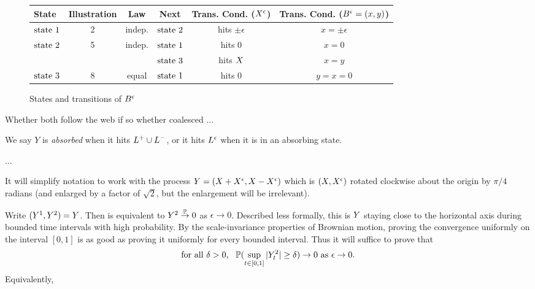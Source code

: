{\begin{figure}\label{fig:twodimtranstab}
\begin{center}
  \begin{tabular}{| l || c | c | c | c | c | }
    \hline
    State & Illustration & Law & Next & Trans. Cond. ($\resamplede$) & Trans. Cond. ($\twodim=(x,y)$) \\
    \hline
    \hline
    $\statenoweb$ & 2 & indep. & $\statewebapart$ & hits $\pm\epsilon$ & $x=\pm\epsilon$ \\
    \hline
    \multirow{2}{*}{$\statewebapart$} & \multirow{2}{*}{5} & \multirow{2}{*}{indep.} & $\statenoweb$ & hits $0$ & $x=0$ \\ \cline{4-6}
        &  &  & $\statewebtogether$ & hits $\sampled$ & $x=y$\\
    \hline
    $\statewebtogether$  & 8 & equal & $\statenoweb$ &  hits $0$ & $y=x=0$\\
    \hline
  \end{tabular}
\end{center}
\caption{States and transitions of $\twodim$}
\end{figure}

Whether both follow the web
if so whether coalesced
...

\begin{definition}
  We say $Y$ is \emph{absorbed} when it hits $\L$, or it hits $\Le$
  when it is in an absorbing state.
\end{definition}

...

It will simplify notation to work with the process $\rotproc =
(\sampled + \resamplede, \sampled - \resamplede)$ which is $(\sampled,
\resamplede)$ rotated clockwise about the origin by $\pi / 4$ radians (and enlarged by a factor of
$\sqrt{2}$, but the enlargement will be irrelevant).

Write $(\rotproc^1, \rotproc^2) = Y$.
Then \statementoflemresampledetosampled{} is equivalent to $\rotproc^2
\toinP 0$ as $\epsilon \to 0$.
Described less formally, this is $\rotproc$ staying close to the
horizontal axis during bounded time intervals with high probability.
By the scale-invariance properties of Brownian motion, proving the
convergence uniformly on the interval $[0,1]$ is as good as proving it
uniformly for every bounded interval.  Thus it will suffice to prove that
\[\text{
  for all $\delta > 0$, \, $\P(\sup_{t \in [0,1]} |Y^2_t| \ge \delta) \to 0$ as $\epsilon
  \to 0$.
}\]
\newcommand{\boundarylines}{A}
Equivalently,
\FIXME{}{Introduce $\boundarylines$}

}
